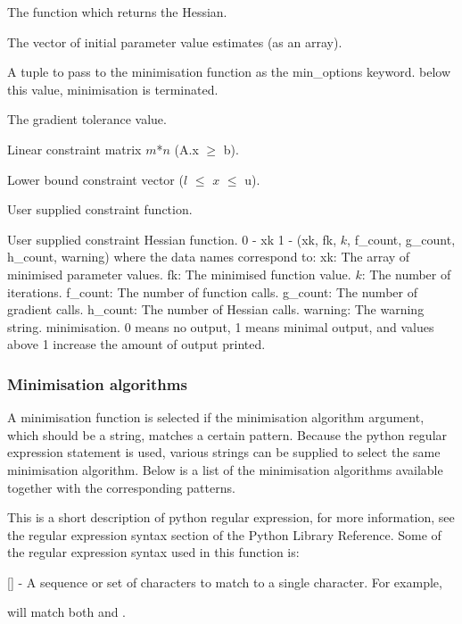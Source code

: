   The function which returns the Hessian.

  The vector of initial parameter value estimates (as an array).

  A tuple to pass to the minimisation function as the min\_options keyword.
below this value, minimisation is terminated.

  The gradient tolerance value.

  Linear constraint matrix $m$*$n$ (A.x $\ge$ b).

  Lower bound constraint vector ($l$ $\le$ $x$ $\le$ u).

  User supplied constraint function.

  User supplied constraint Hessian function.
 0 - xk 1 - (xk, fk, $k$, f\_count, g\_count, h\_count, warning) where the data names correspond to: xk:      The array of minimised parameter values. fk:      The minimised function value. $k$:       The number of iterations. f\_count: The number of function calls. g\_count: The number of gradient calls. h\_count: The number of Hessian calls. warning: The warning string.
minimisation.  0 means no output, 1 means minimal output, and values above 1 increase the amount
of output printed.


\subsubsection{Minimisation algorithms}

A minimisation function is selected if the minimisation algorithm argument, which should be a
string, matches a certain pattern.  Because the python regular expression 
 statement is
used, various strings can be supplied to select the same minimisation algorithm.  Below is a
list of the minimisation algorithms available together with the corresponding patterns.

This is a short description of python regular expression, for more information, see the
regular expression syntax section of the Python Library Reference.  Some of the regular
expression syntax used in this function is:

    [] - A sequence or set of characters to match to a single character.  For example,
    
 will match both 
 and 
.

